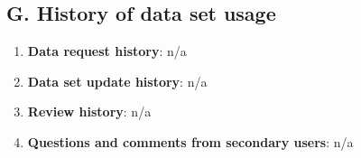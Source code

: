 \documentclass[a4paper,twoside,10pt]{article}
\begin{document}
   \subsection*{ G. History of data set usage}
  		\begin{enumerate}
  			\item \textbf{Data request history}: n/a
        		\item \textbf{Data set update history}: n/a
        		\item \textbf{Review history}: n/a
       		\item \textbf{Questions and comments from secondary users}: n/a
  		\end{enumerate}
       


\clearpage

\end{document}
